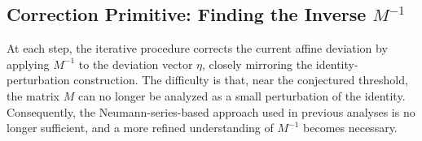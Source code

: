 \documentclass[12pt]{article}
\newtheorem{remark}[theorem]{Remark}
\newcommand{\calP}{\mathcal{P}}
\newcommand{\calB}{\mathcal{B}}
\newcommand{\Authornote}[3]{{\sf\footnotesize\color{#3}{[#1: #2]}}}
\newcommand{\Authornote}[3]{}
\newcommand{\jnote}[1]{\Authornote{Jeff}{#1}{blue}}
\newcommand{\anote}[1]{\Authornote{Aaron}{#1}{cyan}}
\begin{document}
%
%
%

\subsection{Correction Primitive: Finding the Inverse \texorpdfstring{\(M^{-1}\)}{of M}}
At each step, the iterative procedure corrects the current affine deviation by applying \(M^{-1}\) to the deviation
vector \(\eta\), closely mirroring the identity-perturbation construction. The
difficulty is that, near the conjectured threshold, the matrix \(M\) can no
longer be analyzed as a small perturbation of the identity. Consequently, the
Neumann-series-based approach used in previous analyses is no longer sufficient,
and a more refined understanding of \(M^{-1}\) becomes necessary.
\end{document}
